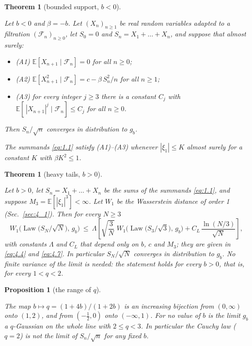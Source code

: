 \documentclass[aip,jmp,preprint,onecolumn,floatfix,superscriptaddress,nofootinbib,11pt]{revtex4-2}
\theoremstyle{plain}
\newtheorem{theoremA}{Theorem}
\newtheorem{theoremB}{Theorem}
\newtheorem{propositionC}{Proposition}
\theoremstyle{remark}
\numberwithin{equation}{section}
\newcommand{\E}{\mathbb{E}}
\newcommand{\Law}{\operatorname{Law}}
\begin{document}
\begin{theoremA}[bounded support, $b<0$]\label{theor:A}
 
Let $b<0$ and $\beta=-b$. Let $(X_n)_{n\ge1}$ be real random variables adapted to a filtration $(\mathcal F_n)_{n\ge0}$, let $S_0=0$ and $S_n=X_1+\dots+X_n$, and suppose that almost surely:
 
\begin{itemize}
\item (A1) $\E[X_{n+1}\mid\mathcal F_n]=0$ for all $n\ge0$;
\item (A2) $\E[X_{n+1}^{2}\mid\mathcal F_n]=c-\beta\,S_n^{2}/n$ for all $n\ge1$;
\item (A3) for every integer $j\ge3$ there is a constant $C_j$ with $\E[\,|X_{n+1}|^{j}\mid\mathcal F_n]\le C_j$ for all $n\ge0$.
\end{itemize}
%
Then $S_n/\sqrt n$ converges in distribution to $g_b$.
 
The summands \eqref{eq:1.1} satisfy (A1)--(A3) whenever $|\xi_1|\le K$ almost surely for a constant $K$ with $\beta K^{2}\le1$.
 
\end{theoremA}
 
 
 
 
\begin{theoremB}[heavy tails, $b>0$]\label{theor:B}
 
Let $b>0$, let $S_n=X_1+\dots+X_n$ be the sums of the summands \eqref{eq:1.1}, and suppose $M_3=\E[|\xi_1|^{3}]<\infty$. Let $W_1$ be the Wasserstein distance of order 1 (Sec.~\ref{sec:4_1}). Then for every $N\ge3$
%
\begin{equation}
W_1\Big(\Law\big(S_N/\sqrt N\big),\,g_b\Big)\ \le\ \Lambda\left[\sqrt{\frac{3}{N}}\;W_1\Big(\Law\big(S_3/\sqrt 3\big),\,g_b\Big)+C_L\,\frac{\ln (N/3)}{\sqrt N}\right],
\label{eq:1.5}
\end{equation}
%
with constants $\Lambda$ and $C_L$ that depend only on $b$, $c$ and $M_3$; they are given in \eqref{eq:4.4} and \eqref{eq:4.7}. In particular $S_N/\sqrt N$ converges in distribution to $g_b$. No finite variance of the limit is needed: the statement holds for every $b>0$, that is, for every $1<q<2$.
 
\end{theoremB}
 
\begin{propositionC}[the range of $q$]\label{prop:C}
 
The map $b\mapsto q=(1+4b)/(1+2b)$ is an increasing bijection from $(0,\infty)$ onto $(1,2)$, and from $(-\tfrac12,0)$ onto $(-\infty,1)$. For no value of $b$ is the limit $g_b$ a $q$-Gaussian on the whole line with $2\le q<3$. In particular the Cauchy law ($q=2$) is not the limit of $S_n/\sqrt n$ for any fixed $b$.
 
\end{propositionC}
 
\end{document}
